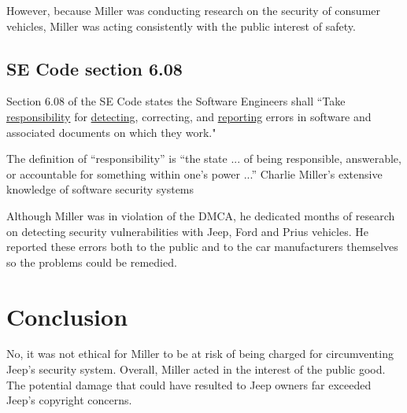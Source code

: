 \documentclass[12pt]{article}
\begin{document}
\begin{multicols}{2}
However, because Miller was conducting research on the security of consumer vehicles, Miller was acting consistently with the public interest of safety.




\subsection{SE Code section 6.08}

Section 6.08 of the SE Code states the Software Engineers shall ``Take \underline{responsibility} for \underline{detecting}, correcting, and \underline{reporting} errors in software and associated documents on which they work."\cite{seCode}

The definition of ``responsibility'' is ``the state ... of being responsible, answerable, or accountable for something within one's power ...''
Charlie Miller's extensive knowledge of software security systems 

Although Miller was in violation of the DMCA, he dedicated months of research on detecting security vulnerabilities with Jeep, Ford and Prius vehicles. He reported these errors both to the public and to the car manufacturers themselves so the problems could be remedied. 

\section{Conclusion}

No, it was not ethical for Miller to be at risk of being charged for circumventing Jeep's security system. Overall, Miller acted in the interest of the public good. The potential damage that could have resulted to Jeep owners far exceeded Jeep's copyright concerns.

\end{multicols}

\nocite{*}



\newpage

\end{document}
